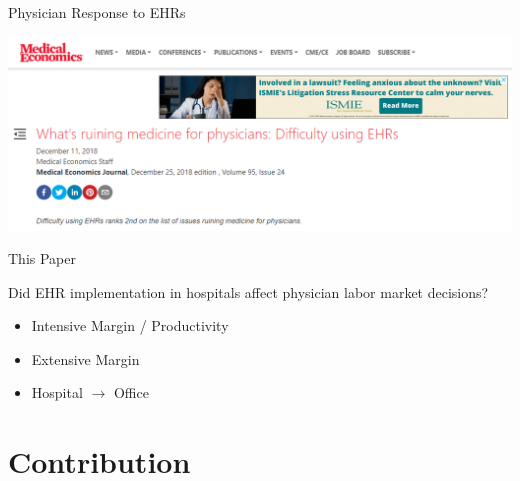 \documentclass[10pt]{beamer}
\begin{document}
\begin{frame}[noframenumbering]{Physician Response to EHRs}
\begin{center}
    \includegraphics[scale=.35]{graphics/News Clip3.PNG}
\end{center}
\end{frame}

\begin{frame}{This Paper}

Did EHR implementation in hospitals affect physician labor market decisions?
\begin{itemize}
    \item Intensive Margin / Productivity
    \item Extensive Margin
    \item Hospital $\rightarrow$ Office
\end{itemize}
\end{frame}


\section{Contribution}
\end{document}
